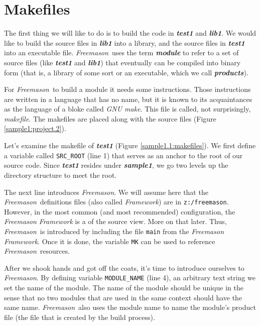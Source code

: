 \documentclass[a4paper]{article}
\newcommand{\freemason}{\textit{Freemason}}
\newcommand{\name}[1]{\emph{#1}}
\newcommand{\nameb}[1]{\textbf{\emph{#1}}}
\newcommand{\concept}[1]{\textit{#1}}
\newcommand{\conceptb}[1]{\textbf{\textit{#1}}}
\begin{document}
\newpage
\section{Makefiles}
The first thing we will like to do is to build the code in \nameb{test1} and \nameb{lib1}. We would like to build the source files in
\nameb{lib1} into a library, and the source files in \nameb{test1} into an executable file.
\freemason\ uses the term \conceptb{module} to refer to a set of source files (like \nameb{test1} and \nameb{lib1}) that eventually
can be compiled into binary form (that is, a library of some sort or an executable, which we call \conceptb{products}).
\par
For \freemason\ to build a module it needs some instructions. Those instructions are written in a language that has no name,
but it is known to its acquaintances as the language of a bloke called \name{GNU make}. This file is called, not surprisingly,
\concept{makefile}. The makefiles are placed along with the source files (Figure \ref{sample1:project.2}).
\par
Let's examine the makefile of \nameb{test1} (Figure \ref{sample1.1:makefiles}). We first define a variable called \verb"SRC_ROOT" (line 1)
that serves as an anchor to the root of our source code. Since \nameb{test1} resides under \nameb{sample1}, we go two levels up the directory
structure to meet the root.
\par
The next line introduces \freemason. We will assume here that the \freemason\ definitions files (also
called \concept{Framework}) are in \verb"z:/freemason". However, in the most common (and most recommended) configuration,
the \concept{Freemason Framework} is a of the source view. More on that later. Thus, \freemason\ is introduced by including the file
\verb"main" from the \concept{Freemason Framework}. Once it is done, the variable \verb"MK" can be used to reference \freemason\ resources.
\par
After we shook hands and got off the coats, it's time to introduce ourselves to \freemason. By defining variable \verb"MODULE_NAME" (line 4),
an arbitrary text string we set the name of the module. The name of the module should be unique in the sense
that no two modules that are used in the same context should have the same name.
\freemason\ also uses the module name to name the module's product file (the file that is created by the build process).
\par
\end{document}
